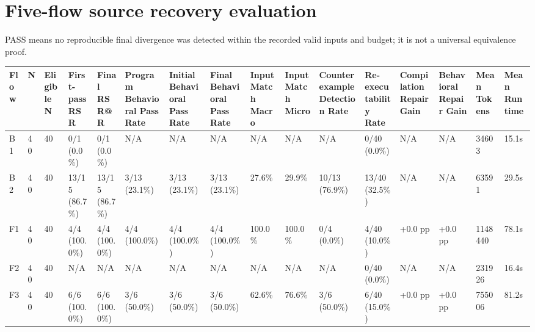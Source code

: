 \documentclass{article}
\begin{document}
\section*{Five-flow source recovery evaluation}
PASS means no reproducible final divergence was detected within the recorded valid inputs and budget; it is not a universal equivalence proof.
\begin{longtable}{llllllllllllllll}
Flow & N & Eligible N & First-pass RSR & Final RSR@R & Program Behavioral Pass Rate & Initial Behavioral Pass Rate & Final Behavioral Pass Rate & Input Match Macro & Input Match Micro & Counterexample Detection Rate & Re-executability Rate & Compilation Repair Gain & Behavioral Repair Gain & Mean Tokens & Mean Runtime \\ \hline
B1 & 40 & 40 & 0/1 (0.0\%) & 0/1 (0.0\%) & N/A & N/A & N/A & N/A & N/A & N/A & 0/40 (0.0\%) & N/A & N/A & 34603 & 15.1s \\
B2 & 40 & 40 & 13/15 (86.7\%) & 13/15 (86.7\%) & 3/13 (23.1\%) & 3/13 (23.1\%) & 3/13 (23.1\%) & 27.6\% & 29.9\% & 10/13 (76.9\%) & 13/40 (32.5\%) & N/A & N/A & 63591 & 29.5s \\
F1 & 40 & 40 & 4/4 (100.0\%) & 4/4 (100.0\%) & 4/4 (100.0\%) & 4/4 (100.0\%) & 4/4 (100.0\%) & 100.0\% & 100.0\% & 0/4 (0.0\%) & 4/40 (10.0\%) & +0.0 pp & +0.0 pp & 1148440 & 78.1s \\
F2 & 40 & 40 & N/A & N/A & N/A & N/A & N/A & N/A & N/A & N/A & 0/40 (0.0\%) & N/A & N/A & 231926 & 16.4s \\
F3 & 40 & 40 & 6/6 (100.0\%) & 6/6 (100.0\%) & 3/6 (50.0\%) & 3/6 (50.0\%) & 3/6 (50.0\%) & 62.6\% & 76.6\% & 3/6 (50.0\%) & 6/40 (15.0\%) & +0.0 pp & +0.0 pp & 755006 & 81.2s \\
\end{longtable}
\end{document}

